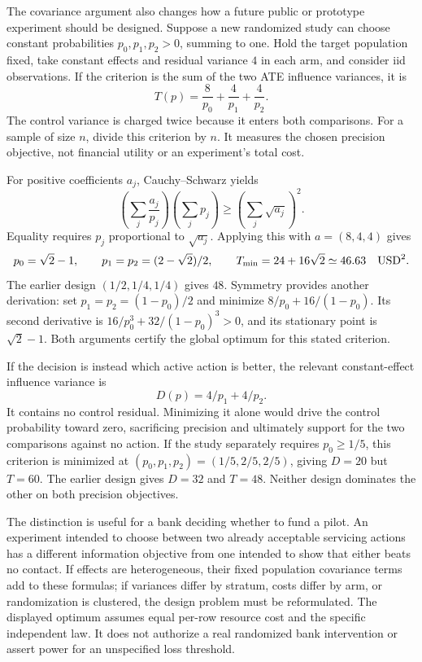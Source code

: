 The covariance argument also changes how a future public or prototype
experiment should be designed. Suppose a new randomized study can choose
constant probabilities $p_0,p_1,p_2>0$, summing to one. Hold the target
population fixed, take constant effects and residual variance $4$ in each
arm, and consider iid observations. If the criterion is the sum of the
two ATE influence variances, it is
\begin{equation}
 T(p)=\frac{8}{p_0}+\frac{4}{p_1}+\frac{4}{p_2}.
 \label{exec17:s4-design-trace}
\end{equation}
The control variance is charged twice because it enters both comparisons.
For a sample of size $n$, divide this criterion by $n$. It measures the
chosen precision objective, not financial utility or an experiment's total
cost.

For positive coefficients $a_j$, Cauchy--Schwarz yields
\[
 \left(\sum_j\frac{a_j}{p_j}\right)\left(\sum_jp_j\right)
       \geq\left(\sum_j\sqrt{a_j}\right)^2.
\]
Equality requires $p_j$ proportional to $\sqrt{a_j}$. Applying this with
$a=(8,4,4)$ gives
\[
 p_0=\sqrt2-1,\qquad p_1=p_2=(2-\sqrt2)/2,\qquad
 T_{\min}=24+16\sqrt2\simeq46.63\quad {\rm USD}^2.
\]
The earlier design $(1/2,1/4,1/4)$ gives $48$. Symmetry provides another
derivation: set $p_1=p_2=(1-p_0)/2$ and minimize
$8/p_0+16/(1-p_0)$. Its second derivative is
$16/p_0^3+32/(1-p_0)^3>0$, and its stationary point is $\sqrt2-1$.
Both arguments certify the global optimum for this stated criterion.
\citep{exec17_s4_extension}

If the decision is instead which active action is better, the relevant
constant-effect influence variance is
\[
 D(p)=4/p_1+4/p_2.
\]
It contains no control residual. Minimizing it alone would drive the
control probability toward zero, sacrificing precision and ultimately
support for the two comparisons against no action. If the study separately
requires $p_0\geq1/5$, this criterion is minimized at
$(p_0,p_1,p_2)=(1/5,2/5,2/5)$, giving $D=20$ but $T=60$.
The earlier design gives $D=32$ and $T=48$. Neither design dominates the
other on both precision objectives.

The distinction is useful for a bank deciding whether to fund a pilot.
An experiment intended to choose between two already acceptable servicing
actions has a different information objective from one intended to show
that either beats no contact. If effects are heterogeneous, their fixed
population covariance terms add to these formulas; if variances differ
by stratum, costs differ by arm, or randomization is clustered, the design
problem must be reformulated. The displayed optimum assumes equal per-row
resource cost and the specific independent law. It does not authorize a
real randomized bank intervention or assert power for an unspecified loss
threshold.

